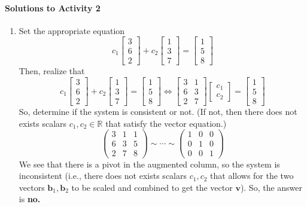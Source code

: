 \documentclass[titlepage, a4paper, 10pt]{article}
\renewcommand{\vec}[1]{\mathbf{#1}}
\begin{document}
\paragraph{Solutions to Activity 2}
\begin{enumerate}
\item Set the appropriate equation \[c_1\begin{bmatrix}3 \\ 6 \\ 2\end{bmatrix} + c_2\begin{bmatrix}1 \\ 3 \\ 7\end{bmatrix} = \begin{bmatrix}1 \\ 5 \\ 8\end{bmatrix}\] Then, realize that \[c_1\begin{bmatrix}3 \\ 6 \\ 2\end{bmatrix} + c_2\begin{bmatrix}1 \\ 3 \\ 7\end{bmatrix} = \begin{bmatrix}1 \\ 5 \\ 8\end{bmatrix} \iff \begin{bmatrix}3 & 1 \\ 6 & 3 \\ 2 & 7\end{bmatrix}\begin{bmatrix}c_1 \\ c_2\end{bmatrix} = \begin{bmatrix}1 \\ 5 \\ 8\end{bmatrix}\]
So, determine if the system is consistent or not. (If not, then there does not exists scalars \(c_1, c_2 \in \mathbb{R}\) that satisfy the vector equation.)
\[\left(\begin{array}{cc|c}3 & 1 & 1 \\ 6 & 3 & 5 \\ 2 & 7 & 8\end{array}\right) \sim \cdots \sim \left(\begin{array}{cc|c}1 & 0 & 0 \\ 0 & 1 & 0 \\ 0 & 0 & 1\end{array}\right)\]
We see that there is a pivot in the augmented column, so the system is inconsistent (i.e., there does not exists scalars \(c_1, c_2\) that allows for the two vectors \(\vec{b}_1, \vec{b}_2\) to be scaled and combined to get the vector \(\vec{v}\)). So, the answer is \textbf{no.}


\end{enumerate}
\end{document}
